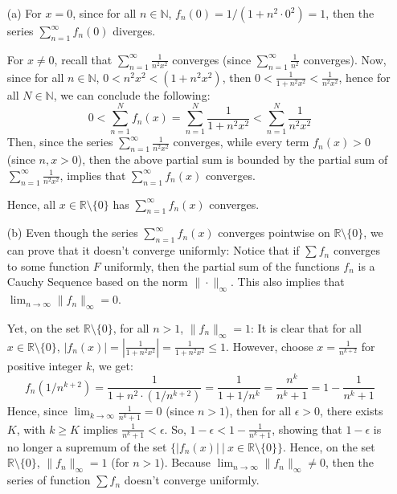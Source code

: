 \documentclass{article}
\begin{document}
\begin{itemize}
    \item[(a)] For $x=0$, since for all $n\in\mathbb{N}$, $f_n(0)=1/(1+n^2\cdot 0^2)=1$, then the series $\sum_{n=1}^{\infty} f_n(0)$ diverges.
    
    For $x\neq 0$, recall that $\sum_{n=1}^{\infty}\frac{1}{n^2x^2}$ converges (since $\sum_{n=1}^{\infty}\frac{1}{n^2}$ converges).
    Now, since for all $n\in\mathbb{N}$, $0< n^2x^2 < (1+n^2x^2)$, then $0<\frac{1}{1+n^2x^2}<\frac{1}{n^2x^2}$, hence for all $N\in\mathbb{N}$, we can conclude the following:
    $$0 < \sum_{n=1}^{N}f_n(x)=\sum_{n=1}^{N}\frac{1}{1+n^2x^2}<\sum_{n=1}^{N}\frac{1}{n^2x^2}$$
    Then, since the series $\sum_{n=1}^{\infty}\frac{1}{n^2x^2}$ converges, while every term $f_n(x)>0$ (since $n,x>0$), then the above partial sum is bounded by the partial sum of $\sum_{n=1}^{\infty}\frac{1}{n^2x^2}$,
    implies that $\sum_{n=1}^{\infty}f_n(x)$ converges.

    Hence, all $x\in \mathbb{R}\setminus\{0\}$ has $\sum_{n=1}^{\infty}f_n(x)$ converges.
    
    \hfill
    
    \item[(b)] Even though the series $\sum_{n=1}^{\infty}f_n(x)$ converges pointwise on $\mathbb{R}\setminus\{0\}$, we can prove that it doesn't converge uniformly:
    Notice that if $\sum f_n$ converges to some function $F$ uniformly, then the partial sum of the functions $f_n$ is a Cauchy Sequence based on the norm $\|\cdot\|_\infty$.
    This also implies that $\lim_{n\rightarrow\infty}\|f_n\|_\infty = 0$.

    Yet, on the set $\mathbb{R}\setminus\{0\}$, for all $n>1$, $\|f_n\|_\infty = 1$: It is clear that for all $x\in\mathbb{R}\setminus\{0\}$, $|f_n(x)|=|\frac{1}{1+n^2x^2}|=\frac{1}{1+n^2x^2}\leq 1$.
    However, choose $x=\frac{1}{n^{k+2}}$ for positive integer $k$, we get:
    $$f_n(1/n^{k+2}) = \frac{1}{1+n^2\cdot (1/n^{k+2})} = \frac{1}{1+1/n^k} = \frac{n^k}{n^k+1} = 1-\frac{1}{n^k+1}$$
    Hence, since $\lim_{k\rightarrow\infty}\frac{1}{n^k+1} = 0$ (since $n>1$), then for all $\epsilon>0$, there exists $K$, with $k\geq K$ implies $\frac{1}{n^k+1}<\epsilon$.
    So, $1-\epsilon < 1-\frac{1}{n^k+1}$, showing that $1-\epsilon$ is no longer a supremum of the set $\{|f_n(x)|\ |\ x\in\mathbb{R}\setminus\{0\}\}$. Hence, on the set $\mathbb{R}\setminus\{0\}$, $\|f_n\|_\infty=1$ (for $n>1$). Because $\lim_{n\rightarrow\infty}\|f_n\|_\infty\neq 0$, 
    then the series of function $\sum f_n$ doesn't converge uniformly.


\end{itemize}
\end{document}
